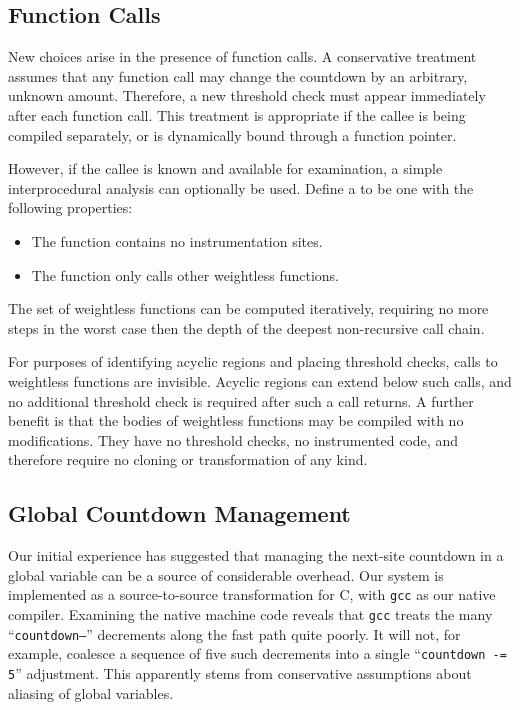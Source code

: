 \subsection{Function Calls}

New choices arise in the presence of function calls.  A conservative
treatment assumes that any function call may change the countdown by
an arbitrary, unknown amount.  Therefore, a new threshold check must
appear immediately after each function call.  This treatment is
appropriate if the callee is being compiled separately, or is
dynamically bound through a function pointer.

However, if the callee is known and available for examination, a
simple interprocedural analysis can optionally be used.  Define a
 to be one with the following properties:

\begin{itemize}
\item The function contains no instrumentation sites.
\item The function only calls other weightless functions.
\end{itemize}

The set of weightless functions can be computed iteratively, requiring
no more steps in the worst case then the depth of the deepest
non-recursive call chain.

For purposes of identifying acyclic regions and placing threshold
checks, calls to weightless functions are invisible.  Acyclic regions
can extend below such calls, and no additional threshold check is
required after such a call returns.  A further benefit is that the
bodies of weightless functions may be compiled with no modifications.
They have no threshold checks, no instrumented code, and therefore
require no cloning or transformation of any kind.

\subsection{Global Countdown Management}

Our initial experience has suggested that managing the next-site
countdown in a global variable can be a source of considerable
overhead.  Our system is implemented as a source-to-source
transformation for C, with \texttt{gcc} as our native compiler.
Examining the native machine code reveals that \texttt{gcc} treats the
many ``\texttt{countdown--}'' decrements along the fast path quite
poorly.  It will not, for example, coalesce a sequence of five such
decrements into a single ``\texttt{countdown -= 5}'' adjustment.  This
apparently stems from conservative assumptions about aliasing of
global variables.

